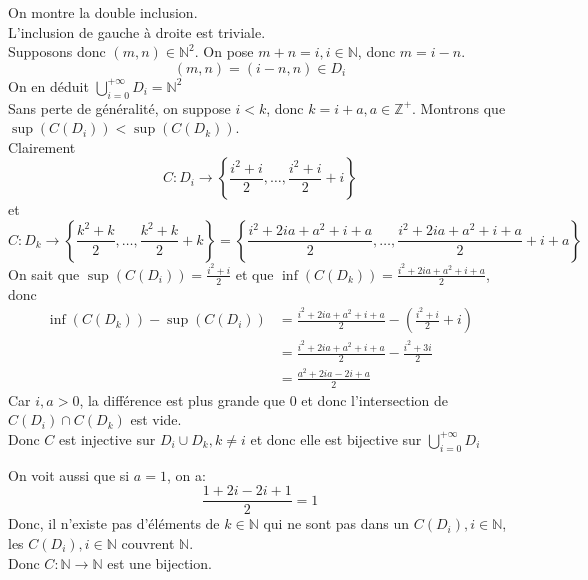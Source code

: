 \documentclass[11pt, a4paper]{article}
\begin{document}
		On montre la double inclusion.\\
		L'inclusion de gauche à droite est triviale.\\
		Supposons donc $(m,n) \in \mathbb{N}^{2}$. On pose $m+n=i, i \in \mathbb{N}$, donc $m=i-n$.
		\[ 
			(m,n) = (i-n,n) \in D_i
		\]
		On en déduit $\bigcup_{i=0}^{+\infty} D_i = \mathbb{N}^{2}$\\
		Sans perte de généralité, on suppose $i<k$, donc $k= i+a, a \in \mathbb{Z}^{+} $.
		Montrons que $\sup(C(D_i)) < \sup(C(D_k))$.\\
		Clairement
		\[ 
			C: D_i \to \left\{ \frac{i^{2}+i}{2}, \ldots,  \frac{i^{2}+i}{2}+i\right\} 
		\]
		et 
		\[ 
			C: D_k \to \left\{ \frac{k^{2}+k}{2}, \ldots,  \frac{k^{2}+k}{2}+k\right\} = \left\{ \frac{i^{2}+2ia+a^{2}+i+a}{2}, \ldots, \frac{i^{2}+2ia+a^{2}+i+a}{2} + i+a\right\} 
		\]
		On sait que $\sup(C(D_i))= \frac{i^{2}+i}{2}$ et que $\inf(C(D_k))= \frac{i^{2}+2ia+a^{2}+i+a}{2}$, donc
		\begin{align*}
			\inf(C(D_k)) - \sup(C(D_i)) &= \frac{i^{2}+2ia+a^{2}+i+a}{2} -\left(\frac{i^{2}+i}{2}+i\right)\\
						&= \frac{i^{2}+2ia+a^{2}+i+a}{2} - \frac{i^{2}+3i}{2}\\
						    &=  \frac{a^{2}+2ia-2i+a}{2}
		\end{align*}
		Car $i,a> 0$, la différence est plus grande que $0$ et donc l'intersection de $C(D_i) \cap C(D_k)$ est vide.\\
		Donc $C$ est injective sur $D_i \cup D_k, k \neq i$ et donc elle est bijective sur $\bigcup_{i=0}^{+ \infty } D_i$
	
On voit aussi que si $a=1$, on a:
\[ 
\frac{1+2i - 2i+1}{2}=1
\]
Donc, il n'existe pas d'éléments de $k \in \mathbb{N}$ qui ne sont pas dans un $C(D_i),i \in \mathbb{N}$, les $C(D_i),i \in \mathbb{N}$ couvrent $\mathbb{N}$.\\
Donc $C:\mathbb{N} \to \mathbb{N}$ est une bijection.
\end{document}
